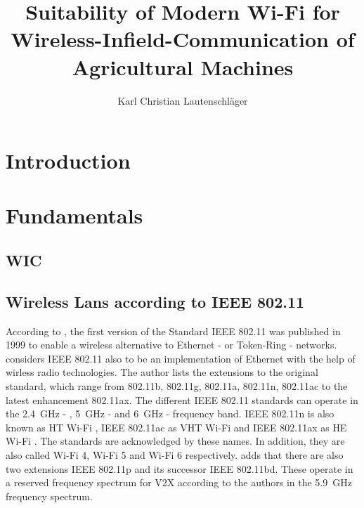 \documentclass[]{nsm-thesis}
\author{Karl Christian Lautenschläger}
\title{Suitability of Modern Wi-Fi for Wireless-Infield-Communication of Agricultural Machines}
\begin{document}

\maketitle

\cleardoublepage





\tableofcontents

\cleardoublepage
{}


\chapter{Introduction}
\label{sec:introduction}


\chapter{Fundamentals}
\label{sec:fundamentals}


\section{\acl{WIC}}





\section{Wireless Lans according to IEEE 802.11}


According to \textcite[41]{kauffels_wireless_2002}, the first version of the Standard IEEE 802.11 was published in 1999 to enable a wireless alternative to Ethernet - or Token-Ring - networks.
\textcite[265-268]{sauter_wireless_2022} considers IEEE 802.11 also to be an implementation of Ethernet with the help of wirless radio technologies.
The author lists the extensions to the original standard, which range from 802.11b, 802.11g, 802.11a, 802.11n, 802.11ac to the latest enhancement 802.11ax. The different IEEE 802.11 standards can operate in the  \SI{2.4}{\giga\hertz} - , \SI{5}{\giga\hertz} - and \SI{6}{\giga\hertz} - frequency band.
IEEE 802.11n is also known as \ac{HT} Wi-Fi \cite{ieee_standard_2009n}, IEEE 802.11ac as \ac{VHT} Wi-Fi \cite{ieee_standard_2020} and IEEE 802.11ax as \ac{HE} Wi-Fi \cite{ieee_standard_2021ax}.
The standards are acknowledged by these names.
In addition, they are also called Wi-Fi 4, Wi-Fi 5 and Wi-Fi 6 respectively.
\textcite{jacob_system-level_2020} adds that there are also two extensions IEEE 802.11p and its successor IEEE 802.11bd. These operate in a reserved frequency spectrum for \ac{V2X} according to the authors in the \SI{5.9}{\giga\hertz} frequency spectrum.
\end{document}

